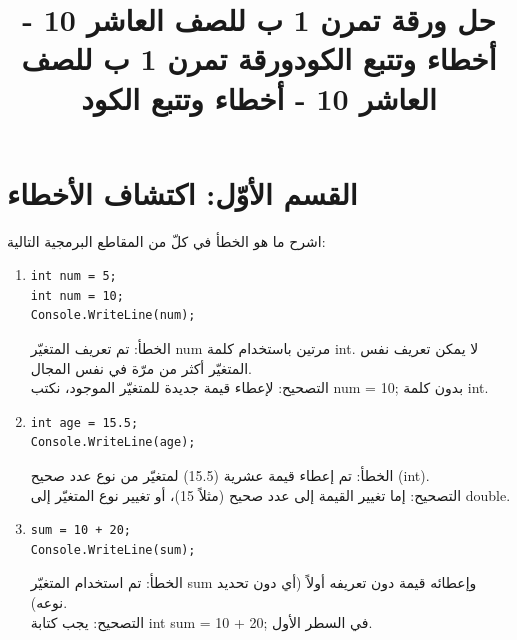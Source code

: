 \documentclass[14pt]{extarticle}
\title{حل ورقة تمرن 1 ب للصف العاشر 10 - أخطاء وتتبع الكود}
\title{ورقة تمرن 1 ب للصف العاشر 10 - أخطاء وتتبع الكود}
\begin{document}
\maketitle
\thispagestyle{fancy}

\section*{القسم الأوّل: اكتشاف الأخطاء}
اشرح ما هو الخطأ في كلّ من المقاطع البرمجية التالية:

\begin{enumerate}[itemsep=2em]

\item
\begin{english}
\begin{verbatim}
int num = 5;
int num = 10;
Console.WriteLine(num);
\end{verbatim}
\end{english}
\ifwithsols
\begin{boxSolution}
الخطأ: تم تعريف المتغيّر \textenglish{num} مرتين باستخدام كلمة \textenglish{int}. لا يمكن تعريف نفس المتغيّر أكثر من مرّة في نفس المجال. \\
التصحيح: لإعطاء قيمة جديدة للمتغيّر الموجود، نكتب \textenglish{num = 10;} بدون كلمة \textenglish{int}.
\end{boxSolution}
\fi

\item
\begin{english}
\begin{verbatim}
int age = 15.5;
Console.WriteLine(age);
\end{verbatim}
\end{english}
\ifwithsols
\begin{boxSolution}
الخطأ: تم إعطاء قيمة عشرية \textenglish{(15.5)} لمتغيّر من نوع عدد صحيح \textenglish{(int)}. \\
التصحيح: إما تغيير القيمة إلى عدد صحيح (مثلاً 15)، أو تغيير نوع المتغيّر إلى \textenglish{double}.
\end{boxSolution}
\fi

\ifwhiteblack
\clearpage
\fi
\item
\begin{english}
\begin{verbatim}
sum = 10 + 20;
Console.WriteLine(sum);
\end{verbatim}
\end{english}
\ifwithsols
\begin{boxSolution}
الخطأ: تم استخدام المتغيّر \textenglish{sum} وإعطائه قيمة دون تعريفه أولاً (أي دون تحديد نوعه). \\
التصحيح: يجب كتابة \textenglish{int sum = 10 + 20;} في السطر الأول.
\end{boxSolution}
\fi


\end{enumerate}
\end{document}
